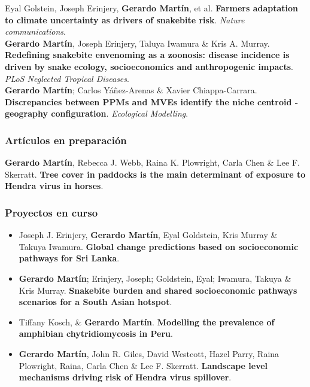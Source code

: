 \documentclass[11pt, letter]{article}
\newcommand{\years}[1]{\marginnote{\scriptsize #1}}
\begin{document}
\years{2022} Eyal Golstein, Joseph Erinjery, \textbf{Gerardo Mart\'in}, et al. \textbf{Farmers adaptation to climate uncertainty as drivers of snakebite risk}. \emph{Nature communications}.\\

\years{2021} \textbf{Gerardo Mart\'in}, Joseph Erinjery, Taluya Iwamura \& Kris A. Murray. \textbf{Redefining snakebite envenoming as a zoonosis: disease incidence is driven by snake ecology, socioeconomics and anthropogenic impacts}. \emph{PLoS Neglected Tropical Diseases}.\\

\years{2021} \textbf{Gerardo Mart\'in}; Carlos Y\'a\~nez-Arenas \& Xavier Chiappa-Carrara. \textbf{Discrepancies between PPMs and MVEs identify the niche centroid - geography configuration}. \emph{Ecological Modelling}.

\subsubsection*{Art\'iculos en preparaci\'on}

\years{2019} \textbf{Gerardo Mart\'in}, Rebecca J. Webb, Raina K. Plowright, Carla Chen \& Lee F. Skerratt. \textbf{Tree cover in paddocks is the main determinant of exposure to Hendra virus in horses}.\\

\subsubsection*{Proyectos en curso}

\begin{itemize}

	\item  Joseph J. Erinjery, \textbf{Gerardo Mart\'in}, Eyal Goldstein, Kris Murray \& Takuya Iwamura. \textbf{Global change predictions based on socioeconomic pathways for Sri Lanka}.\\
	
	\item \textbf{Gerardo Mart\'in}; Erinjery, Joseph; Goldstein, Eyal; Iwamura, Takuya \& Kris Murray. \textbf{Snakebite burden and shared socioeconomic pathways scenarios for a South Asian hotspot}.\\
	
	\item Tiffany Kosch, \& \textbf{Gerardo Mart\'in}. \textbf{Modelling the prevalence of amphibian chytridiomycosis in Peru}.\\
	
	\item \textbf{Gerardo Mart\'in}, John R. Giles, David Westcott, Hazel Parry, Raina Plowright, Raina, Carla Chen \& Lee F. Skerratt. \textbf{Landscape level mechanisms driving risk of Hendra virus spillover}.\\
\end{itemize}
\end{document}
